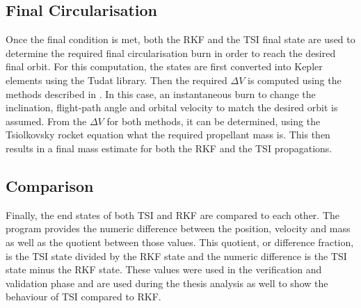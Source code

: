 \subsection{Final Circularisation}
\label{subsec:finalCircularisation}
Once the final condition is met, both the \ac{RKF} and the \ac{TSI} final state are used to determine the required final circularisation burn in order to reach the desired final orbit. For this computation, the states are first converted into Kepler elements using the \ac{Tudat} library. Then the required $\Delta V$ is computed using the methods described in . In this case, an instantaneous burn to change the inclination, flight-path angle and orbital velocity to match the desired orbit is assumed. From the $\Delta V$ for both methods, it can be determined, using   the Tsiolkovsky rocket equation what the required propellant mass is. This then results in a final mass estimate for both the \ac{RKF} and the \ac{TSI} propagations.


\subsection{Comparison}
\label{subsec:comparison}
Finally, the end states of both \ac{TSI} and \ac{RKF} are compared to each other. The program provides the numeric difference between the position, velocity and mass as well as the quotient between those values. This quotient, or difference fraction, is the \ac{TSI} state divided by the \ac{RKF} state and the numeric difference is the \ac{TSI} state minus the \ac{RKF} state. These values were used in the verification and validation phase and are used during the thesis analysis as well to show the behaviour of \ac{TSI} compared to \ac{RKF}.  


